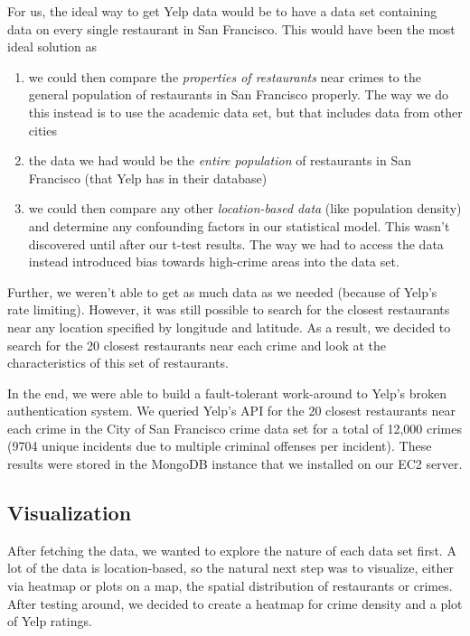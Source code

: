 \documentclass{article}
\begin{document}
For us, the ideal way to get Yelp data would be to have a data set
containing data on every single restaurant in San Francisco. This would
have been the most ideal solution as
\begin{enumerate}
\item we could then compare the \textit{properties of restaurants} near
  crimes to the general population of restaurants in San Francisco
  properly. The way we do this instead is to use the academic data set, but
  that includes data from other cities
\item the data we had would be the \textit{entire population} of restaurants in San
  Francisco (that Yelp has in their database)
\item we could then compare any other \textit{location-based data} (like
  population density) and determine any confounding factors in our
  statistical model. This wasn't discovered until after our t-test
  results. The way we had to access the data instead introduced bias
  towards high-crime areas into the data set.
\end{enumerate}

Further, we weren't able to get as much data as we needed (because of
Yelp's rate limiting). However, it was still possible to search for the
closest restaurants near any location specified by longitude and
latitude. As a result, we decided to search for the 20 closest restaurants
near each crime and look at the characteristics of this set of restaurants.

In the end, we were able to build a fault-tolerant work-around to Yelp's
broken authentication system. We queried Yelp's API for the 20 closest
restaurants near each crime in the City of San Francisco crime data set for
a total of 12,000 crimes (9704 unique incidents due to multiple criminal
offenses per incident). These results were stored in the MongoDB instance
that we installed on our EC2 server.

\subsection{Visualization}

After fetching the data, we wanted to explore the nature of each data set
first. A lot of the data is location-based, so the natural next step was to
visualize, either via heatmap or plots on a map, the spatial distribution
of restaurants or crimes. After testing around, we decided to create a
heatmap for crime density and a plot of Yelp ratings.
\end{document}
